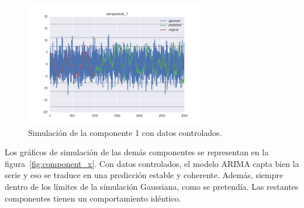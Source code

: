 \documentclass[11pt,spanish,listoffigures,listoftables]{tfgetsinf}
\begin{document}
    \begin{figure}[H]
        \centering
        \includegraphics[width=0.7\textwidth]{simulated_data_8_columns/component_1.png}
        \caption{Simulación de la componente 1 con datos controlados.}
        \label{fig:component_1}
    \end{figure}
    
    Los gráficos de simulación de las demás componentes se representan en la figura~\ref{fig:component_x}. Con datos controlados, el modelo ARIMA capta bien la serie y eso se traduce en una predicción estable y coherente. Además, siempre dentro de los límites de la simulación Gaussiana, como se pretendía. Las restantes componentes tienen un comportamiento idéntico.
    
\end{document}
